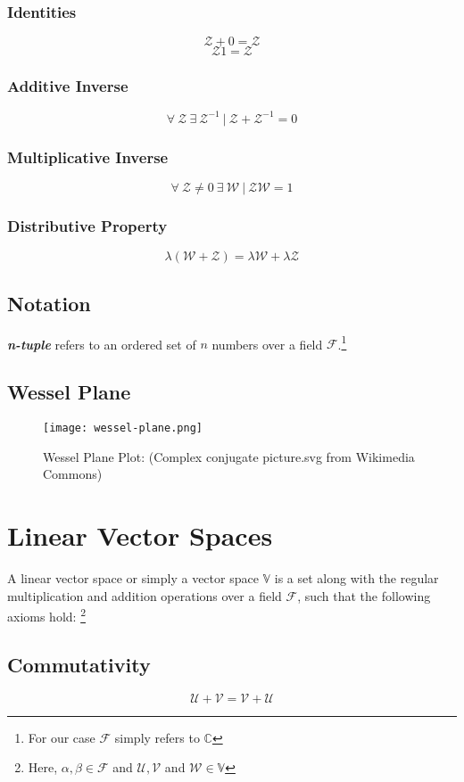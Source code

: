 \subsubsection{Identities}
$$\mathcal{Z} + 0 = \mathcal{Z}$$
$$\mathcal{Z}1 = \mathcal{Z}$$
\subsubsection{Additive Inverse}
$$\forall \ \mathcal{Z} \ \exists \ \mathcal{Z}^{-1} \ | \ \mathcal{Z} + \mathcal{Z}^{-1} = 0$$
\subsubsection{Multiplicative Inverse}
$$\forall \  \mathcal{Z} \neq 0 \ \exists \ \mathcal{W} \ | \ \mathcal{Z}\mathcal{W} = 1$$
\subsubsection{Distributive Property}
$$\lambda(\mathcal{W} + \mathcal{Z}) = \lambda\mathcal{W} + \lambda\mathcal{Z}$$
\subsection{Notation}
\textit{\textbf{n-tuple}} refers to an ordered set of $n$ numbers over a field $\mathcal{F}$.\footnote{For our case $\mathcal{F}$ simply refers to $\mathbb{C}$}
\subsection{Wessel Plane}
\begin{figure}
	\centering
	\texttt{[image: wessel-plane.png]}
	\caption{Wessel Plane Plot: (Complex conjugate picture.svg from Wikimedia Commons)}
\end{figure}
\section{Linear Vector Spaces} 
A linear vector space or simply a vector space $\mathbb{V}$ is a set along with the regular multiplication and addition operations over a field $\mathcal{F}$, such that the following axioms hold: \footnote{Here, $\alpha , \beta \in \mathcal{F}$ and $\mathcal{U}, \mathcal{V} $ and $\mathcal{W} \in \mathbb{V}$} \\
\subsection{Commutativity}
$$\mathcal{U} + \mathcal{V} = \mathcal{V} + \mathcal{U}$$
